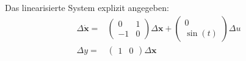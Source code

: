 \documentclass[crop=false]{standalone}
\begin{document}
\begin{task}
\begin{enumerate}[i.]
\begin{solution}
 Das linearisierte System explizit angegeben:
 \[ \begin{aligned} \Delta \dot{\mathbf{x}} =& \begin{pmatrix} 0 & 1 \\ -1 & 0\end{pmatrix} \Delta \mathbf{x} + \begin{pmatrix} 0 \\ \sin (t) \end{pmatrix} \Delta u\\ 
 \Delta y =& \begin{pmatrix} 1 & 0 \end{pmatrix} \Delta \mathbf{x}
    \end{aligned}
 \]
    \end{solution}
 \end{enumerate}
\end{task}
\end{document}
